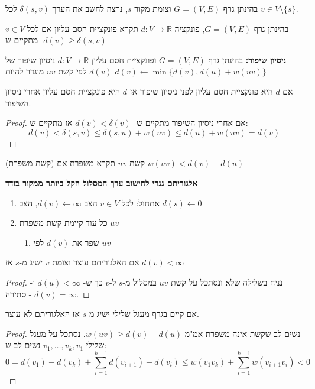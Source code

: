 בהינתן גרף 
$G = (V, E)$
וצומת מקור $s$,
נרצה לחשב את הערך 
$\delta(s,v)$
לכל 
$v \in V \setminus \{s\}$.

\begin{definition}
בהינתן גרף 
$G = (V, E)$,
פונקציה 
$d:V \to \mathbb{R}$
תקרא פונקציית חסם עליון אם לכל 
$v \in V$
מתקיים ש-%
$d(v) \geq \delta(s,v)$
\end{definition}

\textbf{ניסיון שיפור:}
בהינתן גרף 
$G = (V,E)$
ופונקציית חסם עליון 
$d:V \to \mathbb{R}$
ניסיון שיפור של
$d(v)$
לפי קשת $uv$ מוגדר להיות
$d(v) \leftarrow \min\{d(v), d(u) + w(uv)\}$

\begin{claim}
אם $d$ היא פונקציית חסם עליון לפני ניסיון שיפור אז $d$ היא פונקציית חסם עליון אחרי ניסיון השיפור.
\end{claim}
\begin{proof}
אם אחרי ניסיון השיפור מתקיים ש-%
$d(v) < \delta(v)$
אז מתקיים ש:%
$$d(v) < \delta(s,v) \leq \delta(s,u) + w(uv) \leq d(u) + w(uv) = d(v)$$

\end{proof}

\begin{definition}(קשת משפרת)
קשת
$uv$
תקרא משפרת אם
$w(uv) < d(v) - d(u)$
\end{definition}


\textbf{
אלגוריתם גנרי לחישוב ערך המסלול הקל ביותר ממקור בודד
}

\begin{enumerate}
\item
אתחול:
לכל 
$v \in V$
הצב
$d(v) \leftarrow \infty$,
הצב
$d(s) \leftarrow 0$
\item
כל עוד קיימת קשת משפרת 
$uv$
\begin{enumerate}
\item
שפר את 
$d(v)$
לפי
$uv$
\end{enumerate}
\end{enumerate}

\begin{claim}
אם האלגוריתם עוצר וצומת $v$ ישיג מ-$s$ אז 
$d(v) < \infty$
\end{claim}
\begin{proof}
נניח בשלילה שלא ונסתכל על קשת
$uv$
במסלול מ-$s$ ל-$v$ כך ש-%
$d(u) < \infty$
ו-%
$d(v) = \infty$
- סתירה.
\end{proof}



\begin{claim}
אם קיים בגרף מעגל שלילי ישיג מ-$s$ אז האלגוריתם לא עוצר.
\end{claim}
\begin{proof}
נשים לב שקשת אינה משפרת אמ"מ 
$w(uv) \geq d(v) - d(u)$.
נסתכל על מעגל שלילי
$v_1, \ldots, v_k, v_1$
נשים לב ש:
$$
0 = 
d(v_1) - d(v_k) + \sum_{i=1}^{k-1} d(v_{i + 1}) - d(v_{i})
\leq
w(v_1v_k) + \sum_{i=1}^{k-1} w(v_{i+1}v_i) < 0
$$
\end{proof}



